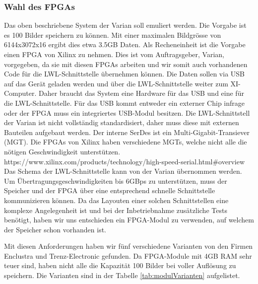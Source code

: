 \documentclass{article}
\begin{document}
\subsubsection*{Wahl des FPGAs}
Das oben beschriebene System der Varian soll emuliert werden. Die Vorgabe ist es 100 Bilder speichern zu können. Mit einer maximalen Bildgrösse von 6144x3072x16 ergibt dies etwa 3.5GB Daten. Als Recheneinheit ist die Vorgabe einen FPGA von Xilinx zu nehmen. Dies ist vom Auftragsgeber, Varian, vorgegeben, da sie mit diesen FPGAs arbeiten und wir somit auch vorhandenen Code für die LWL-Schnittstelle übernehmen können. Die Daten sollen via USB auf das Gerät geladen werden und über die LWL-Schnittstelle weiter zum XI-Computer. Daher braucht das System eine Hardware für das USB und eine für die LWL-Schnittstelle. Für das USB kommt entweder ein externer Chip infrage oder der FPGA muss ein integriertes USB-Modul besitzen. Die LWL-Schnittstell der Varian ist nicht vollständig standardisiert, daher muss diese mit externen Bauteilen aufgebaut werden. Der interne SerDes ist ein Multi-Gigabit-Transiever (MGT). Die FPGAs von Xilinx haben verschiedene MGTs, welche nicht alle die nötigen Geschwindigkeit unterstützen. https://www.xilinx.com/products/technology/high-speed-serial.html\#overview Das Schema der LWL-Schnittstelle kann von der Varian übernommen werden. Um Übertragungsgeschwindigkeiten bis 6GBps zu unterstützen, muss der Speicher und der FPGA über eine entsprechend schnelle Schnittstelle kommunizieren können. Da das Layouten einer solchen Schnittstellen eine komplexe Angelegenheit ist und bei der Inbetriebnahme zusätzliche Tests benötigt, haben wir uns entschieden ein FPGA-Modul zu verwenden, auf welchem der Speicher schon vorhanden ist. 

Mit diesen Anforderungen haben wir fünf verschiedene Varianten von den Firmen Enclustra und Trenz-Electronic gefunden. Da FPGA-Module mit 4GB RAM sehr teuer sind, haben nicht alle die Kapazität 100 Bilder bei voller Auflösung zu speichern. Die Varianten sind in der Tabelle \ref{tab:modulVarianten} aufgelistet.
\end{document}
